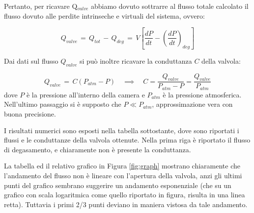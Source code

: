 Pertanto, per ricavare Q$_{valve}$ abbiamo dovuto sottrarre al flusso totale calcolato il flusso  dovuto alle perdite intrinseche e virtuali del sistema, ovvero:

\begin{equation}
	Q_{valve} \, = \, Q_{tot} \, - \, Q_{deg} \, = \, V \left[ \frac{dP}{dt} - \left(\frac{dP}{dt}\right)_{deg} \right]
\end{equation}

Dai dati sul flusso $Q_{valve}$ si può inoltre ricavare la conduttanza $C$ della valvola:

\begin{equation}
	Q_{valve} \, = \, C (P_{atm} - P) \quad \implies \quad C = \frac{Q_{valve}}{P_{atm} - P} = \frac{Q_{valve}}{P_{atm}}
\end{equation}
%
dove $P$ è la pressione all'interno della camera e $P_{atm}$ è la pressione atmosferica. Nell'ultimo passaggio si è supposto
che $P \ll P_{atm}$, approssimazione vera con buona precisione.

I risultati numerici sono esposti nella tabella sottostante, dove sono riportati i flussi e le conduttanze della valvola ottenute.
Nella prima riga è riportato il flusso di degasamento, e chiaramente non è presente la conduttanza.



La tabella ed il relativo grafico in Figura \ref{fig:graph} mostrano chiaramente che l'andamento del flusso non è lineare con
l'apertura della valvola, anzi gli ultimi punti del grafico sembrano suggerire un andamento esponenziale (che su un grafico
con scala logaritmica come quello riportato in figura, risulta in una linea retta). Tuttavia i primi 2/3
punti deviano in maniera vistosa da tale andamento.
